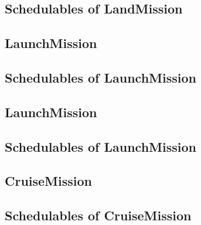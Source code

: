 \documentclass[10pt,a4paper]{article}
\begin{document}
\subsection{Schedulables of LandMission}


\newpage


\newpage


\newpage


\subsection{LaunchMission}

\newpage

\subsection{Schedulables of LaunchMission}


\newpage


\subsection{LaunchMission}

\newpage

\subsection{Schedulables of LaunchMission}


\newpage


\subsection{CruiseMission}

\newpage

\subsection{Schedulables of CruiseMission}


\newpage


\newpage


\newpage


\end{document}

